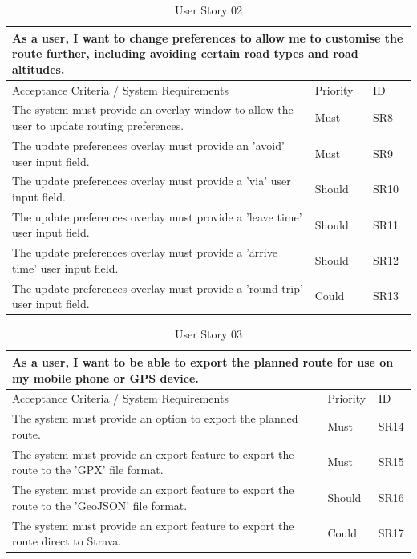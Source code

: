 \begin{table}[!htb]
\caption{User Story 02}
\label{tab:user-story-02}
\begin{tabular}{ p{8cm} p{1cm}  p{1cm} }
\hline
\multicolumn{3}{p{13cm}}{As a user, I want to change preferences to allow me to customise the route further, including avoiding certain road types and road altitudes.}\\ 
\hline
Acceptance Criteria / System Requirements & Priority & ID\\
\hline
The system must provide an overlay window to allow the user to update routing preferences. & Must & SR8 \\
The update preferences overlay must provide an 'avoid' user input field. & Must & SR9\\
The update preferences overlay must provide a 'via' user input field. & Should & SR10\\ 
The update preferences overlay must provide a 'leave time' user input field. & Should & SR11\\ 
The update preferences overlay must provide a 'arrive time' user input field. & Should & SR12\\ 
The update preferences overlay must provide a 'round trip' user input field. & Could & SR13\\ 
\hline
\end{tabular}
\end{table}

\begin{table}[!htb]
\caption{User Story 03}
\label{tab:user-story-03}
\begin{tabular}{ p{8cm} p{1cm}  p{1cm} }
\hline
\multicolumn{3}{p{13cm}}{As a user, I want to be able to export the planned route for use on my mobile phone or GPS device.}\\ 
\hline
Acceptance Criteria / System Requirements & Priority & ID\\
\hline
The system must provide an option to export the planned route. & Must & SR14 \\
The system must provide an export feature to export the route to the 'GPX' file format. & Must & SR15\\
The system must provide an export feature to export the route to the 'GeoJSON' file format. & Should & SR16\\ 
The system must provide an export feature to export the route direct to Strava. & Could & SR17\\ 
\hline
\end{tabular}
\end{table}

